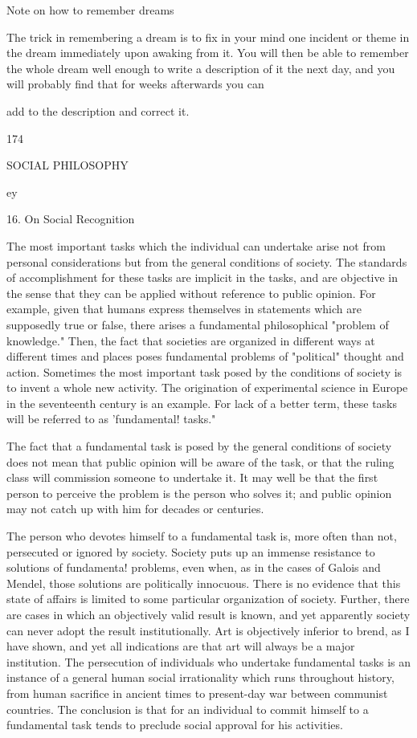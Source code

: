 \documentclass[10pt,twoside]{memoir}
\begin{document}
\begin{enumerate}
{{Note on how to remember dreams 

The trick in remembering a dream is to fix in your mind one incident or 
theme in the dream immediately upon awaking from it. You will then be 
able to remember the whole dream well enough to write a description of it 
the next day, and you will probably find that for weeks afterwards you can 


add to the description and correct it. 


174 


SOCIAL PHILOSOPHY 


ey 


16. On Social Recognition 


The most important tasks which the individual can undertake arise not 
from personal considerations but from the general conditions of society. The 
standards of accomplishment for these tasks are implicit in the tasks, and are 
objective in the sense that they can be applied without reference to public 
opinion. For example, given that humans express themselves in statements 
which are supposedly true or false, there arises a fundamental philosophical 
"problem of knowledge." Then, the fact that societies are organized in 
different ways at different times and places poses fundamental problems of 
"political" thought and action. Sometimes the most important task posed by 
the conditions of society is to invent a whole new activity. The origination 
of experimental science in Europe in the seventeenth century is an example. 
For lack of a better term, these tasks will be referred to as 'fundamental! 
tasks." 

The fact that a fundamental task is posed by the general conditions of 
society does not mean that public opinion will be aware of the task, or that 
the ruling class will commission someone to undertake it. It may well be that 
the first person to perceive the problem is the person who solves it; and 
public opinion may not catch up with him for decades or centuries. 

The person who devotes himself to a fundamental task is, more often 
than not, persecuted or ignored by society. Society puts up an immense 
resistance to solutions of fundamenta! problems, even when, as in the cases 
of Galois and Mendel, those solutions are politically innocuous. There is no 
evidence that this state of affairs is limited to some particular organization of 
society. Further, there are cases in which an objectively valid result is 
known, and yet apparently society can never adopt the result institutionally. 
Art is objectively inferior to brend, as I have shown, and yet all indications 
are that art will always be a major institution. The persecution of individuals 
who undertake fundamental tasks is an instance of a general human social 
irrationality which runs throughout history, from human sacrifice in ancient 
times to present-day war between communist countries. The conclusion is 
that for an individual to commit himself to a fundamental task tends to 
preclude social approval for his activities. 

}}
\end{enumerate}
\end{document}
